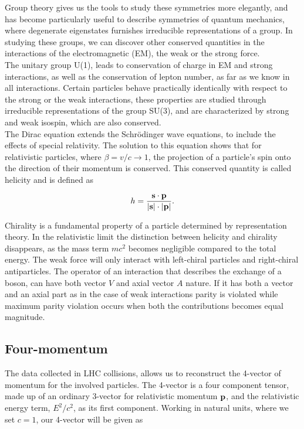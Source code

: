 \documentclass[11pt,a4paper]{article}
\begin{document}
Group theory gives us the tools to study these symmetries more elegantly, and
has become particularly useful to describe symmetries of quantum mechanics,
where degenerate eigenstates furnishes irreducible representations of a group.
In studying these groups, we can discover other conserved quantities in the
interactions of the electromagnetic (EM), the weak or the strong force.\\

The unitary group U(1), leads to conservation of charge in EM and strong
interactions, as well as the conservation of lepton number, as far as
we know in all interactions. Certain particles behave practically identically
with respect to the strong or the weak interactions, these properties are
studied through irreducible representations of the group SU(3), and are
characterized by strong and weak isospin, which are also conserved.\\

The Dirac equation extends the Schrödinger wave equations, to include the effects of special relativity. The solution to this equation shows that for relativistic particles, where $\beta = v/c \rightarrow 1$, the projection of a particle's spin onto the direction of their momentum is conserved. This conserved quantity is called helicity and is defined as

\begin{equation}
h = \frac{\vb s \cdot \vb p}{\abs{\vb s} \cdot \abs{\vb p}}.
\end{equation}

Chirality is a fundamental property of a particle determined by representation theory. In the relativistic limit the distinction between helicity and chirality disappears, as the mass term $mc^2$ becomes negligible compared to the total energy. The weak force will only interact with left-chiral particles and right-chiral antiparticles. The operator of an interaction that describes the exchange of a boson, can have both vector $V$ and axial vector $A$ nature. If it has both a vector and an axial part as in the case of weak interactions parity is violated while maximum parity violation occurs when both the contributions becomes equal magnitude.

\subsection{Four-momentum}
The data collected in LHC collisions, allows us to reconstruct the 4-vector of momentum for the involved particles. The 4-vector is a four component tensor, made up of an ordinary 3-vector for relativistic momentum $\vb p$, and the relativistic energy term, $E^2/c^2$, as its first component. Working in natural units, where we set $c=1$, our 4-vector will be given as
\end{document}
